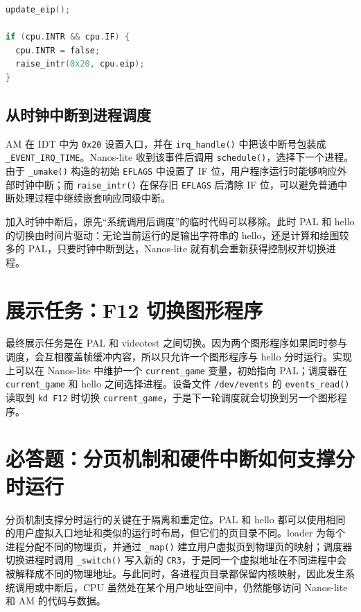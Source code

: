 \begin{lstlisting}[language=C,caption={时钟中断响应的逻辑},frame=single]
update_eip();

if (cpu.INTR && cpu.IF) {
  cpu.INTR = false;
  raise_intr(0x20, cpu.eip);
}
\end{lstlisting}

\subsection{从时钟中断到进程调度}

AM 在 IDT 中为 \texttt{0x20} 设置入口，并在 \texttt{irq\_handle()} 中把该中断号包装成 \texttt{\_EVENT\_IRQ\_TIME}。Nanos-lite 收到该事件后调用 \texttt{schedule()}，选择下一个进程。由于 \texttt{\_umake()} 构造的初始 \texttt{EFLAGS} 中设置了 IF 位，用户程序运行时能够响应外部时钟中断；而 \texttt{raise\_intr()} 在保存旧 \texttt{EFLAGS} 后清除 IF 位，可以避免普通中断处理过程中继续嵌套响应同级中断。

加入时钟中断后，原先“系统调用后调度”的临时代码可以移除。此时 PAL 和 hello 的切换由时间片驱动：无论当前运行的是输出字符串的 hello，还是计算和绘图较多的 PAL，只要时钟中断到达，Nanos-lite 就有机会重新获得控制权并切换进程。

\section{展示任务：F12 切换图形程序}

最终展示任务是在 PAL 和 videotest 之间切换。因为两个图形程序如果同时参与调度，会互相覆盖帧缓冲内容，所以只允许一个图形程序与 hello 分时运行。实现上可以在 Nanos-lite 中维护一个 \texttt{current\_game} 变量，初始指向 PAL；调度器在 \texttt{current\_game} 和 hello 之间选择进程。设备文件 \texttt{/dev/events} 的 \texttt{events\_read()} 读取到 \texttt{kd F12} 时切换 \texttt{current\_game}，于是下一轮调度就会切换到另一个图形程序。

\section{必答题：分页机制和硬件中断如何支撑分时运行}

分页机制支撑分时运行的关键在于隔离和重定位。PAL 和 hello 都可以使用相同的用户虚拟入口地址和类似的运行时布局，但它们的页目录不同。loader 为每个进程分配不同的物理页，并通过 \texttt{\_map()} 建立用户虚拟页到物理页的映射；调度器切换进程时调用 \texttt{\_switch()} 写入新的 \texttt{CR3}，于是同一个虚拟地址在不同进程中会被解释成不同的物理地址。与此同时，各进程页目录都保留内核映射，因此发生系统调用或中断后，CPU 虽然处在某个用户地址空间中，仍然能够访问 Nanos-lite 和 AM 的代码与数据。

